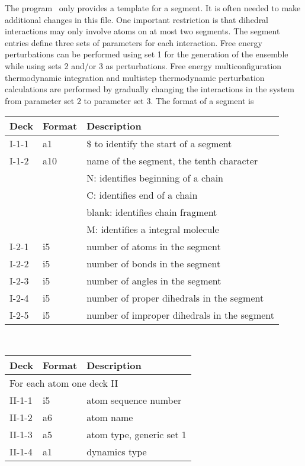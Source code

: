 The program \nwsgm\ only provides a template for a segment. It is
often needed to make additional changes in this file. One important 
restriction is that dihedral interactions may only involve atoms on 
at most two segments. The segment entries define three sets of
parameters for each interaction. Free energy perturbations can be
performed using set 1 for the generation of the ensemble while using
sets 2 and/or 3 as perturbations. Free energy multiconfiguration 
thermodynamic integration and multistep thermodynamic perturbation
calculations are performed by gradually changing the interactions in
the system from parameter set 2 to parameter set 3.
The format of a segment is
\begin{center}
\begin{tabular*}{150mm}{p{12mm}p{12mm}l}
\hline\hline
Deck  & Format & Description \\ \hline
I-1-1 & a1     & \$ to identify the start of a segment \\ %
I-1-2 & a10    & name of the segment, the tenth character\\
      &        & N: identifies beginning of a chain\\
      &        & C: identifies end of a chain\\
      &        & blank: identifies chain fragment\\
      &        & M: identifies a integral molecule\\
I-2-1 & i5     & number of atoms in the segment\\
I-2-2 & i5     & number of bonds in the segment\\
I-2-3 & i5     & number of angles in the segment\\
I-2-4 & i5     & number of proper dihedrals in the segment\\
I-2-5 & i5     & number of improper dihedrals in the segment\\
\hline
\end{tabular*}\\
\begin{tabular*}{150mm}{p{12mm}p{12mm}l}
\hline\hline
Deck & Format & Description \\ \hline
\multicolumn{3}{l}{For each atom one deck II} \\
II-1-1  & i5     & atom sequence number \\
II-1-2  & a6     & atom name \\
II-1-3  & a5     & atom type, generic set 1 \\
II-1-4  & a1     & dynamics type\\

\end{tabular*}
\end{center}
